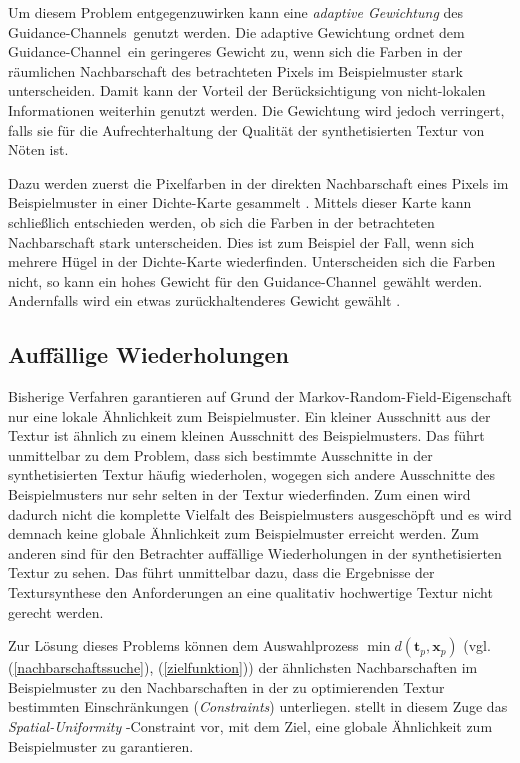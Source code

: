 Um diesem Problem entgegenzuwirken kann eine \emph{adaptive Gewichtung} des \glqq Gui\-dance-Channels\grqq \ genutzt werden.
Die adaptive Gewichtung ordnet dem \glqq Guidance-Channel\grqq \ ein geringeres Gewicht zu, wenn sich die Farben in der räumlichen Nachbarschaft des betrachteten Pixels im Beispielmuster stark unterscheiden.
Damit kann der Vorteil der Berücksichtigung von nicht-lokalen Informationen weiterhin genutzt werden.
Die Gewichtung wird jedoch verringert, falls sie für die Aufrechterhaltung der Qualität der synthetisierten Textur von Nöten ist.

Dazu werden zuerst die Pixelfarben in der direkten Nachbarschaft eines Pixels im Beispielmuster in einer Dichte-Karte gesammelt \cite{SelfTuning}.
Mittels dieser Karte kann schließlich entschieden werden, ob sich die Farben in der betrachteten Nachbarschaft stark unterscheiden.
Dies ist zum Beispiel der Fall, wenn sich mehrere Hügel in der Dichte-Karte wiederfinden.
Unterscheiden sich die Farben nicht, so kann ein hohes Gewicht für den \glqq Guidance-Channel\grqq \ gewählt werden.
Andernfalls wird ein etwas zurückhaltenderes Gewicht gewählt \cite{SelfTuning}.

\subsection{Auffällige Wiederholungen}

Bisherige Verfahren garantieren auf Grund der \glqq Markov-Random-Field\grqq -Eigenschaft nur eine lokale Ähnlichkeit zum Beispielmuster.
Ein kleiner Ausschnitt aus der Textur ist ähnlich zu einem kleinen Ausschnitt des Beispielmusters.
Das führt unmittelbar zu dem Problem, dass sich bestimmte Ausschnitte in der synthetisierten Textur häufig wiederholen, wogegen sich andere Ausschnitte des Beispielmusters nur sehr selten in der Textur wiederfinden.
Zum einen wird dadurch nicht die komplette Vielfalt des Beispielmusters ausgeschöpft und es wird demnach keine globale Ähnlichkeit zum Beispielmuster erreicht werden.
Zum anderen sind für den Betrachter auffällige Wiederholungen in der synthetisierten Textur zu sehen.
Das führt unmittelbar dazu, dass die Ergebnisse der Textursynthese den Anforderungen an eine qualitativ hochwertige Textur nicht gerecht werden.

Zur Lösung dieses Problems können dem Auswahlprozess $\min d(\textbf{t}_p, \textbf{x}_p)$ (vgl. (\ref{nachbarschaftssuche}), (\ref{zielfunktion})) der ähnlichsten Nachbarschaften im Beispielmuster zu den Nachbarschaften in der zu optimierenden Textur bestimmten Einschränkungen (\emph{Constraints}) unterliegen.
\cite{SelfTuning} stellt in diesem Zuge das \emph{\glqq Spatial-Uniformity\grqq} -Constraint vor, mit dem Ziel, eine globale Ähnlichkeit zum Beispielmuster zu garantieren.

